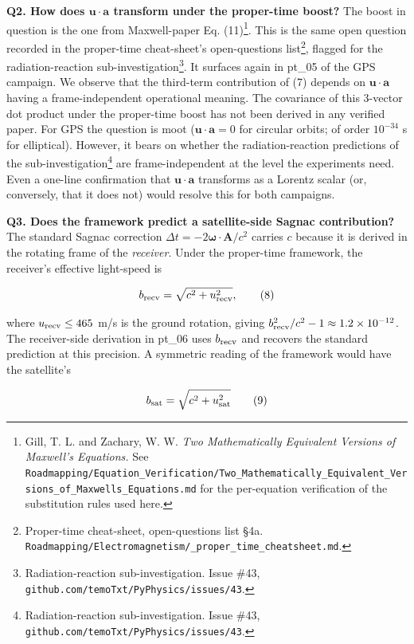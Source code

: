 \documentclass[
  11pt,
]{article}
\begin{document}
\textbf{Q2. How does \(\mathbf{u} \cdot \mathbf{a}\) transform under the
proper-time boost?} The boost in question is the one from Maxwell-paper
Eq. (11)\footnote{Gill, T. L. and Zachary, W. W. \emph{Two
  Mathematically Equivalent Versions of Maxwell's Equations.} See
  \texttt{Roadmapping/Equation\_Verification/Two\_Mathematically\_Equivalent\_Versions\_of\_Maxwells\_Equations.md}
  for the per-equation verification of the substitution rules used here.}.
This is the same open question recorded in the proper-time cheat-sheet's
open-questions list\footnote{Proper-time cheat-sheet, open-questions
  list §4a.
  \texttt{Roadmapping/Electromagnetism/\_proper\_time\_cheatsheet.md}.},
flagged for the radiation-reaction sub-investigation\footnote{Radiation-reaction
  sub-investigation. Issue \#43,
  \texttt{github.com/temoTxt/PyPhysics/issues/43}.}. It surfaces again
in pt\_05 of the GPS campaign. We observe that the third-term
contribution of (7) depends on \(\mathbf{u} \cdot \mathbf{a}\) having a
frame-independent operational meaning. The covariance of this 3-vector
dot product under the proper-time boost has not been derived in any
verified paper. For GPS the question is moot
(\(\mathbf{u} \cdot \mathbf{a} = 0\) for circular orbits; of order
\(10^{-34}\) s for elliptical). However, it bears on whether the
radiation-reaction predictions of the sub-investigation\footnote{Radiation-reaction
  sub-investigation. Issue \#43,
  \texttt{github.com/temoTxt/PyPhysics/issues/43}.} are
frame-independent at the level the experiments need. Even a one-line
confirmation that \(\mathbf{u} \cdot \mathbf{a}\) transforms as a
Lorentz scalar (or, conversely, that it does not) would resolve this for
both campaigns.

\textbf{Q3. Does the framework predict a satellite-side Sagnac
contribution?} The standard Sagnac correction
\(\Delta t = -2\boldsymbol{\omega} \cdot \mathbf{A} / c^2\) carries
\(c\) because it is derived in the rotating frame of the
\emph{receiver}. Under the proper-time framework, the receiver's
effective light-speed is

\[b_{\rm recv} = \sqrt{c^2 + u_{\rm recv}^2}, \qquad (8)\]

where \(u_{\rm recv} \leq 465\) m/s is the ground rotation, giving
\(b_{\rm recv}^2/c^2 - 1 \approx 1.2 \times 10^{-12}\). The
receiver-side derivation in pt\_06 uses \(b_{\rm recv}\) and recovers
the standard prediction at this precision. A symmetric reading of the
framework would have the satellite's

\[b_{\rm sat} = \sqrt{c^2 + u_{\rm sat}^2} \qquad (9)\]
\end{document}
